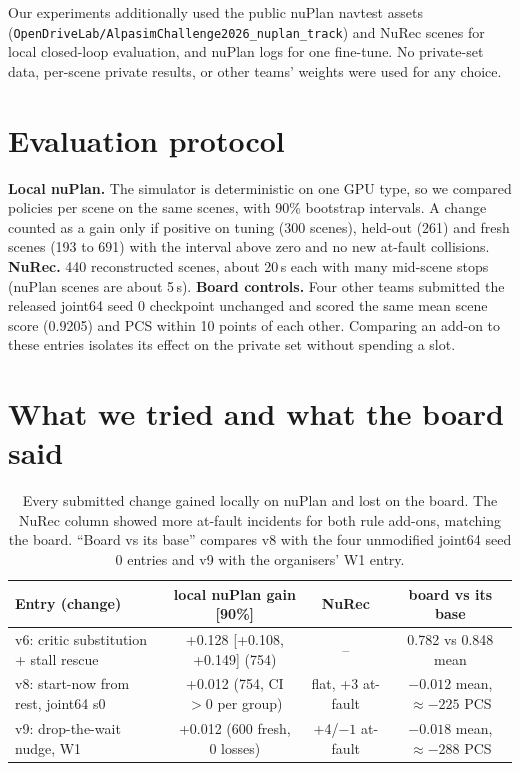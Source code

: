 \documentclass{article}
\begin{document}
Our experiments additionally used the public nuPlan navtest assets (\texttt{OpenDriveLab/AlpasimChallenge2026\_nuplan\_track})
and NuRec scenes for local closed-loop evaluation, and nuPlan logs for one fine-tune. No private-set data,
per-scene private results, or other teams' weights were used for any choice.

\section{Evaluation protocol}
\textbf{Local nuPlan.} The simulator is deterministic on one GPU type, so we compared policies per scene on the
same scenes, with 90\% bootstrap intervals. A change counted as a gain only if positive on tuning (300 scenes),
held-out (261) and fresh scenes (193 to 691) with the interval above zero and no new at-fault collisions.
\textbf{NuRec.} 440 reconstructed scenes, about 20\,s each with many mid-scene stops (nuPlan scenes are about 5\,s).
\textbf{Board controls.} Four other teams submitted the released joint64 seed 0 checkpoint unchanged and scored
the same mean scene score (0.9205) and PCS within 10 points of each other. Comparing an add-on to these entries isolates
its effect on the private set without spending a slot.

\section{What we tried and what the board said}
\begin{table}[h]
\centering\footnotesize\setlength{\tabcolsep}{3pt}
\begin{tabular}{lccc}
\toprule
Entry (change) & local nuPlan gain [90\%] & NuRec & board vs its base \\
\midrule
v6: critic substitution + stall rescue & +0.128 [+0.108, +0.149] (754) & -- & 0.782 vs 0.848 mean \\
v8: start-now from rest, joint64 s0 & +0.012 (754, CI $>0$ per group) & flat, +3 at-fault & $-0.012$ mean, $\approx-225$ PCS \\
v9: drop-the-wait nudge, W1 & +0.012 (600 fresh, 0 losses) & +4/$-1$ at-fault & $-0.018$ mean, $\approx-288$ PCS \\
\bottomrule
\end{tabular}
\caption{Every submitted change gained locally on nuPlan and lost on the board. The NuRec column showed more at-fault
incidents for both rule add-ons, matching the board. ``Board vs its base'' compares v8 with the four unmodified
joint64 seed 0 entries and v9 with the organisers' W1 entry.}
\label{tab:board}
\end{table}
\end{document}
